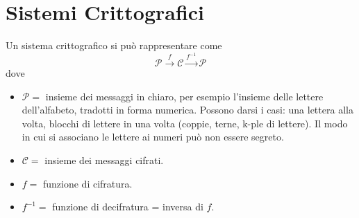 \documentclass[a4paper,12pt, oneside]{book}
\begin{document}
\section{Sistemi Crittografici}
Un sistema crittografico si può rappresentare come $$ \mathcal{P} \overset{\text{$f$}}{\longrightarrow} \mathcal{C} \overset{\text{$f^{-1}$}}{\longrightarrow} \mathcal{P} $$
dove \begin{itemize}
	\item $\mathcal{P} = $ insieme dei messaggi in chiaro, per esempio l’insieme delle lettere dell'alfabeto, tradotti in forma numerica. Possono darsi i casi: una lettera alla volta, blocchi di lettere in una volta (coppie, terne, k-ple di lettere). Il modo in cui si associano le lettere ai numeri può non essere segreto.
	\item $\mathcal{C} = $ insieme dei messaggi cifrati.
	\item $f= $ funzione di cifratura.
	\item $f^{-1} = $ funzione di decifratura = inversa di $f$.
\end{itemize}
\end{document}
